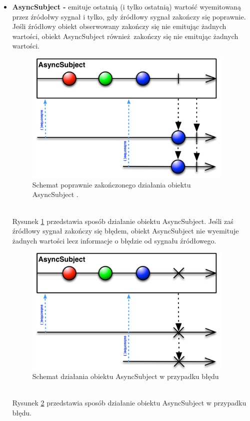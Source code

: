 \documentclass[12pt,oneside,a4paper]{report}
\begin{document}
\begin{itemize}
	\item \textbf{AsyncSubject -} emituje ostatnią (i tylko ostatnią) wartość wyemitowaną przez źródołwy sygnał i tylko, gdy źródłowy sygnał zakończy się poprawnie. Jeśli źródłowy obiekt obserwowany zakończy się nie emitując żadnych wartości, obiekt AsyncSubject również zakończy się nie emitując żadnych wartości.
	\begin{figure}[ht!]
		\centering
		\includegraphics[width=10cm]{asyncSubject}
		\caption{Schemat poprawnie zakończonego działania obiektu AsyncSubject \cite{subjects}.}
		\label{asyncSubject}
	\end{figure}
	\\
	Rysunek \ref{asyncSubject} przedstawia sposób działanie obiektu AsyncSubject. 
	Jeśli zaś źródłowy sygnał zakończy się błędem, obiekt AsyncSubject nie wyemituje żadnych wartości lecz informacje o błędzie od sygnału źródłowego.
	\begin{figure}[ht!]
		\centering
		\includegraphics[width=10cm]{asyncSubjectFailed}
		\caption{Schemat działania obiektu AsyncSubject w przypadku błędu\cite{subjects}}
		\label{asyncSubjectFailed}
	\end{figure}\\
	Rysunek \ref{asyncSubjectFailed} przedstawia sposób działanie obiektu AsyncSubject w przypadku błędu. 
	

\end{itemize}
\end{document}
